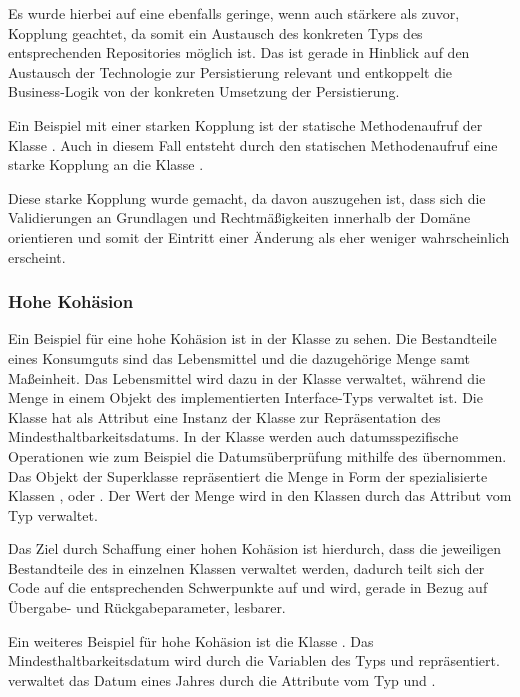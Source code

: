 Es wurde hierbei auf eine ebenfalls geringe, wenn auch stärkere als zuvor, Kopplung geachtet, da somit ein Austausch des konkreten Typs des entsprechenden Repositories möglich ist.
Das ist gerade in Hinblick auf den Austausch der Technologie zur Persistierung relevant und entkoppelt die Business-Logik von der konkreten Umsetzung der Persistierung.

Ein Beispiel mit einer starken Kopplung ist der statische Methodenaufruf \href{}{} der Klasse .
Auch in diesem Fall entsteht durch den statischen Methodenaufruf eine starke Kopplung an die Klasse \href{}{}.

Diese starke Kopplung wurde gemacht, da davon auszugehen ist, dass sich die Validierungen an Grundlagen und Rechtmäßigkeiten innerhalb der Domäne orientieren und somit der Eintritt einer Änderung als eher weniger wahrscheinlich erscheint.

\subsubsection*{Hohe Kohäsion}
Ein Beispiel für eine hohe Kohäsion ist in der Klasse \href{}{} zu sehen.
Die Bestandteile eines Konsumguts sind das Lebensmittel und die dazugehörige Menge samt Maßeinheit.
Das Lebensmittel wird dazu in der Klasse \href{}{} verwaltet, während die Menge in einem Objekt des implementierten Interface-Typs \href{}{} verwaltet ist.
Die Klasse \href{}{} hat als Attribut eine Instanz der Klasse \href{}{} zur Repräsentation des Mindesthaltbarkeitsdatums.
In der Klasse \href{}{} werden auch datumsspezifische Operationen wie zum Beispiel die Datumsüberprüfung mithilfe des \href{}{} übernommen.
Das Objekt der Superklasse \href{}{} repräsentiert die Menge in Form der spezialisierte Klassen \href{}{}, \href{}{} oder \href{}{}.
Der Wert der Menge wird in den Klassen durch das Attribut vom Typ \href{}{} verwaltet.

Das Ziel durch Schaffung einer hohen Kohäsion ist hierdurch, dass die jeweiligen Bestandteile des \href{}{} in einzelnen Klassen verwaltet werden, dadurch teilt sich der Code auf die entsprechenden Schwerpunkte auf und wird, gerade in Bezug auf Übergabe- und Rückgabeparameter, lesbarer.

Ein weiteres Beispiel für hohe Kohäsion ist die Klasse \href{}{}.
Das Mindesthaltbarkeitsdatum wird durch die Variablen des Typs \href{}{} und \href{}{} repräsentiert.
\href{}{} verwaltet das Datum eines Jahres durch die Attribute vom Typ \href{}{} und \href{}{}.

